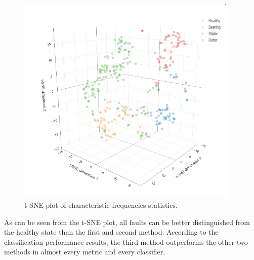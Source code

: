 \begin{figure}[h]
	\centering
	\includegraphics[width=300pt,keepaspectratio=true]{./fig/sne_mcsa.PNG}
	\caption{t-SNE plot of characteristic frequencies statistics.}	
	\label{snem}
\end{figure}

As can be seen from the t-SNE plot, all faults can be better distinguished from the healthy state than the first and second method. According to the classification performance results, the third method outperforms the other two methods in almost every metric and every classifier.


